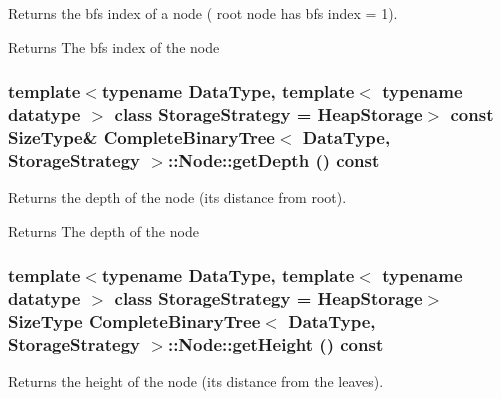 Returns the bfs index of a node ( root node has bfs index = 1). 

\begin{DoxyReturn}{Returns}
The bfs index of the node 
\end{DoxyReturn}
\hypertarget{class_complete_binary_tree_1_1_node_a0745fc163eaa6c63ef8987a2ba881e9e}{
\subsubsection[{getDepth}]{\setlength{\rightskip}{0pt plus 5cm}template$<$typename DataType, template$<$ typename datatype $>$ class StorageStrategy = HeapStorage$>$ const SizeType\& {\bf CompleteBinaryTree}$<$ DataType, StorageStrategy $>$::Node::getDepth () const}}
\label{class_complete_binary_tree_1_1_node_a0745fc163eaa6c63ef8987a2ba881e9e}


Returns the depth of the node (its distance from root). 

\begin{DoxyReturn}{Returns}
The depth of the node 
\end{DoxyReturn}
\hypertarget{class_complete_binary_tree_1_1_node_ace84ee82db224331db70e9668a4f75c1}{
\subsubsection[{getHeight}]{\setlength{\rightskip}{0pt plus 5cm}template$<$typename DataType, template$<$ typename datatype $>$ class StorageStrategy = HeapStorage$>$ SizeType {\bf CompleteBinaryTree}$<$ DataType, StorageStrategy $>$::Node::getHeight () const}}
\label{class_complete_binary_tree_1_1_node_ace84ee82db224331db70e9668a4f75c1}


Returns the height of the node (its distance from the leaves). 

